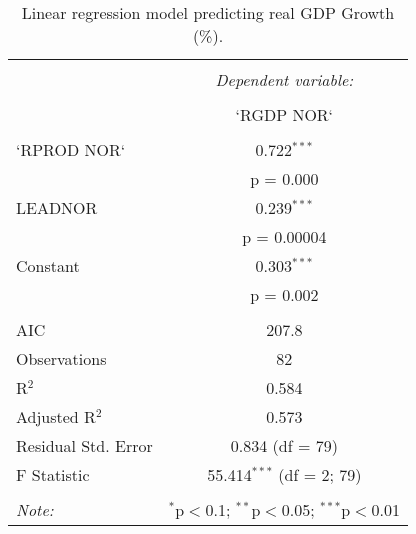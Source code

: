 
\begin{table}[!htbp] \centering 
  \caption{Linear regression model predicting real GDP Growth (\%).} 
  \label{tab::gdp_model} 
\begin{tabular}{@{\extracolsep{5pt}}lc} 
\\[-1.8ex]\hline 
\hline \\[-1.8ex] 
 & \multicolumn{1}{c}{\textit{Dependent variable:}} \\ 
\cline{2-2} 
\\[-1.8ex] & `RGDP NOR` \\ 
\hline \\[-1.8ex] 
 `RPROD NOR` & 0.722$^{***}$ \\ 
  & p = 0.000 \\ 
  LEADNOR & 0.239$^{***}$ \\ 
  & p = 0.00004 \\ 
  Constant & 0.303$^{***}$ \\ 
  & p = 0.002 \\ 
 \hline \\[-1.8ex] 
AIC & 207.8 \\ 
Observations & 82 \\ 
R$^{2}$ & 0.584 \\ 
Adjusted R$^{2}$ & 0.573 \\ 
Residual Std. Error & 0.834 (df = 79) \\ 
F Statistic & 55.414$^{***}$ (df = 2; 79) \\ 
\hline 
\hline \\[-1.8ex] 
\textit{Note:}  & \multicolumn{1}{r}{$^{*}$p$<$0.1; $^{**}$p$<$0.05; $^{***}$p$<$0.01} \\ 
\end{tabular} 
\end{table} 

